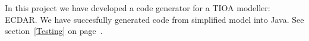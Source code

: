 In this project we have developed a code generator for a TIOA modeller: ECDAR. We have succesfully generated code from simplified model into Java. See section~\ref{Testing} on page~\pageref{Testing}.




